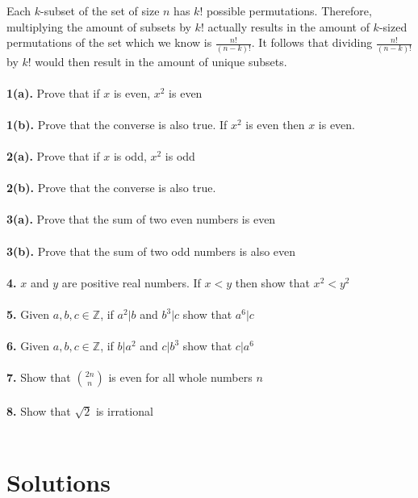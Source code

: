 \documentclass[a4paper,12pt]{article}
\begin{document}
Each $k$-subset of the set of size $n$ has $k!$ possible permutations. Therefore, multiplying the amount of subsets by $k!$ actually results in the amount of $k$-sized permutations of the set which we know is $\frac{n!}{(n-k)!}$. It follows that dividing $\frac{n!}{(n-k)!}$ by $k!$ would then result in the amount of unique subsets.\bigskip\\
\\
\textbf{1(a).} Prove that if $x$ is even, $x^2$ is even\\
\\
\textbf{1(b).} Prove that the converse is also true. If $x^2$ is even then $x$ is even.\bigskip\\
\\
\textbf{2(a).} Prove that if $x$ is odd, $x^2$ is odd\\
\\
\textbf{2(b).} Prove that the converse is also true.\bigskip\\
\\
\textbf{3(a).} Prove that the sum of two even numbers is even\\
\\
\textbf{3(b).} Prove that the sum of two odd numbers is also even\bigskip\\
\\
\textbf{4.} $x$ and $y$ are positive real numbers. If $x < y$ then show that $x^2 < y^2$\bigskip\\
\\
\textbf{5.} Given $a, b, c \in \mathbb Z$, if $a^2 | b$ and $b^3 | c$ show that $a^6 | c$\bigskip\\
\\
\textbf{6.} Given $a, b, c \in \mathbb{Z}$, if $b|a^2$ and $c|b^3$ show that $c|a^6$\bigskip\\
\\
\textbf{7.} Show that $2n \choose n$ is even for all whole numbers $n$\bigskip\\
\\
\textbf{8.} Show that $\sqrt{2}$ is irrational\bigskip\\
\\

\newpage

\section{Solutions}

\newpage
\end{document}
